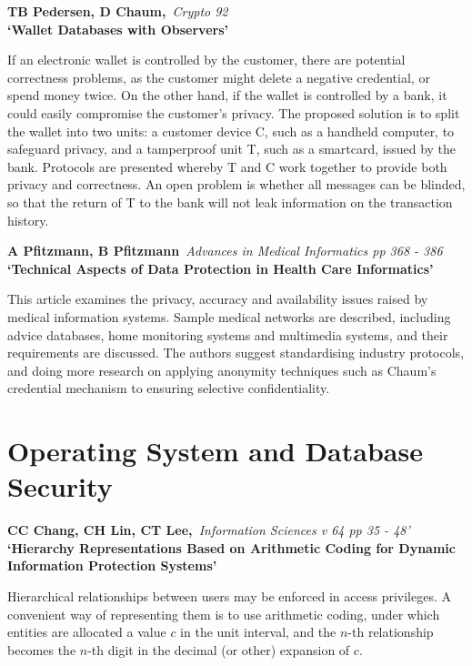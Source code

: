 {\bf \noindent TB Pedersen, D Chaum,}{\em ~Crypto 92\\}
{\bf `Wallet Databases with Observers'}

If an electronic wallet is controlled by the customer, there are
potential correctness problems, as the customer might delete a
negative credential, or spend money twice. On the other hand, if the
wallet is controlled by a bank, it could easily compromise the customer's
privacy. The proposed solution is to split the wallet into two units: a 
customer device C, such as a handheld computer, to safeguard
privacy, and a tamperproof unit T, such as a smartcard, issued by the
bank. Protocols are presented whereby T and C work together to
provide both privacy and correctness. An open problem is whether all
messages can be blinded, so that the return of T to the bank will not
leak information on the transaction history.

{\bf \noindent A Pfitzmann, B Pfitzmann}{\em ~Advances in Medical
Informatics pp 368 - 386}
{\bf `Technical Aspects of Data Protection in Health Care Informatics'}

This article examines the privacy, accuracy and availability issues 
raised by medical information systems. Sample medical networks are 
described, including advice databases, home monitoring systems and 
multimedia systems, and their requirements are discussed. The authors 
suggest standardising industry protocols, and doing more research on 
applying anonymity techniques such as Chaum's credential mechanism to 
ensuring selective confidentiality.





\pagebreak
\normalsize
\section{Operating System and Database Security}
\small

{\bf \noindent CC Chang, CH Lin, CT Lee,}{\em ~Information Sciences v 64
pp 35 - 48'\\}
{\bf `Hierarchy Representations Based on Arithmetic Coding for Dynamic
Information Protection Systems'}

Hierarchical relationships between users may be enforced in access
privileges. A convenient way of representing them is to use arithmetic 
coding, under which entities are allocated a value $c$ in the unit 
interval, and the $n$-th relationship becomes the $n$-th digit in the
decimal (or other) expansion of $c$.

